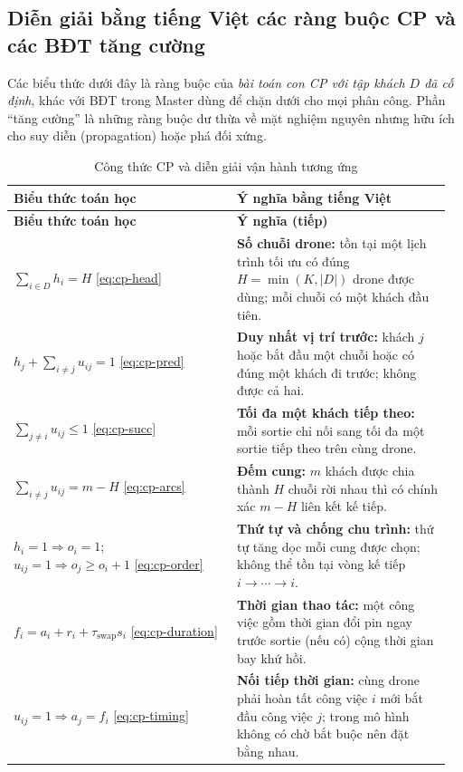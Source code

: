 \documentclass[11pt,a4paper]{article}
\theoremstyle{definition}
\theoremstyle{plain}
\theoremstyle{remark}
\newcommand{\sw}{\tau_{\mathrm{swap}}}
\begin{document}
\subsection{Diễn giải bằng tiếng Việt các ràng buộc CP và các BĐT tăng cường}
\label{subsec:cp-meaning}
Các biểu thức dưới đây là ràng buộc của \emph{bài toán con CP với tập khách $D$ đã cố định}, khác với BĐT trong Master dùng để chặn dưới cho mọi phân công. Phần ``tăng cường'' là những ràng buộc dư thừa về mặt nghiệm nguyên nhưng hữu ích cho suy diễn (propagation) hoặc phá đối xứng.
\begingroup
\small\renewcommand{\arraystretch}{1.33}
\begin{longtable}{@{}p{0.49\linewidth}p{0.47\linewidth}@{}}
\caption{Công thức CP và diễn giải vận hành tương ứng}\label{tab:cp-meaning}\\
\toprule
\textbf{Biểu thức toán học} & \textbf{Ý nghĩa bằng tiếng Việt}\\\midrule
\endfirsthead
\toprule
\textbf{Biểu thức toán học} & \textbf{Ý nghĩa (tiếp)}\\\midrule
\endhead
\bottomrule
\endfoot
$\displaystyle\sum_{i\in D}h_i=H$ \eqref{eq:cp-head}
& \textbf{Số chuỗi drone:} tồn tại một lịch trình tối ưu có đúng $H=\min(K,|D|)$ drone được dùng; mỗi chuỗi có một khách đầu tiên.\\
$\displaystyle h_j+\sum_{i\ne j}u_{ij}=1$ \eqref{eq:cp-pred}
& \textbf{Duy nhất vị trí trước:} khách $j$ hoặc bắt đầu một chuỗi hoặc có đúng một khách đi trước; không được cả hai.\\
$\displaystyle\sum_{j\ne i}u_{ij}\le1$ \eqref{eq:cp-succ}
& \textbf{Tối đa một khách tiếp theo:} mỗi sortie chỉ nối sang tối đa một sortie tiếp theo trên cùng drone.\\
$\displaystyle\sum_{i\ne j}u_{ij}=m-H$ \eqref{eq:cp-arcs}
& \textbf{Đếm cung:} $m$ khách được chia thành $H$ chuỗi rời nhau thì có chính xác $m-H$ liên kết kế tiếp.\\
$h_i=1\Rightarrow o_i=1$; $u_{ij}=1\Rightarrow o_j\ge o_i+1$ \eqref{eq:cp-order}
& \textbf{Thứ tự và chống chu trình:} thứ tự tăng dọc mỗi cung được chọn; không thể tồn tại vòng kế tiếp $i\to\cdots\to i$.\\
$\displaystyle f_i=a_i+r_i+\sw s_i$ \eqref{eq:cp-duration}
& \textbf{Thời gian thao tác:} một công việc gồm thời gian đổi pin ngay trước sortie (nếu có) cộng thời gian bay khứ hồi.\\
$u_{ij}=1\Rightarrow a_j=f_i$ \eqref{eq:cp-timing}
& \textbf{Nối tiếp thời gian:} cùng drone phải hoàn tất công việc $i$ mới bắt đầu công việc $j$; trong mô hình không có chờ bắt buộc nên đặt bằng nhau.\\

\end{longtable}
\end{document}
